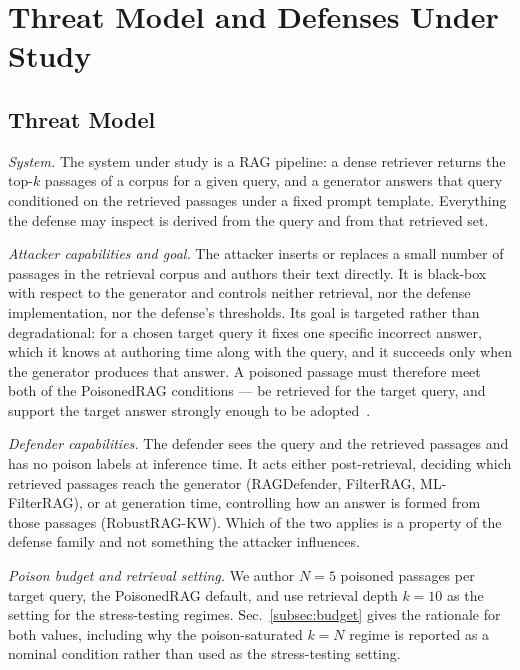 \documentclass[conference]{IEEEtran}
\newcommand{\Npoison}{5}         %
\newcommand{\Ktop}{10}           %
\begin{document}
\section{Threat Model and Defenses Under Study}
\label{sec:threat}

\subsection{Threat Model}
\label{subsec:threatmodel}

\textit{System.} The system under study is a RAG pipeline: a dense retriever
returns the top-$k$ passages of a corpus for a given query, and a generator
answers that query conditioned on the retrieved passages under a fixed prompt
template. Everything the defense may inspect is derived from the query and from
that retrieved set.

\textit{Attacker capabilities and goal.} The attacker inserts or replaces a
small number of passages in the retrieval corpus and authors their text
directly. It is black-box with respect to the generator and controls neither
retrieval, nor the defense implementation, nor the defense's thresholds. Its
goal is targeted rather than degradational: for a chosen target query it fixes
one specific incorrect answer, which it knows at authoring time along with the
query, and it succeeds only when the generator produces that answer. A poisoned
passage must therefore meet both of the PoisonedRAG conditions --- be retrieved
for the target query, and support the target answer strongly enough to be
adopted~\cite{zou2025poisonedrag}.

\textit{Defender capabilities.} The defender sees the query and the retrieved
passages and has no poison labels at inference time. It acts either
post-retrieval, deciding which retrieved passages reach the generator
(RAGDefender, FilterRAG, ML-FilterRAG), or at generation time, controlling how
an answer is formed from those passages (RobustRAG-KW). Which of the two applies
is a property of the defense family and not something the attacker influences.

\textit{Poison budget and retrieval setting.} We author $N=\Npoison$ poisoned
passages per target query, the PoisonedRAG default, and use retrieval depth
$k=\Ktop$ as the setting for the stress-testing regimes.
Sec.~\ref{subsec:budget} gives the rationale for both values, including why the
poison-saturated $k=N$ regime is reported as a nominal condition rather than
used as the stress-testing setting.
\end{document}
